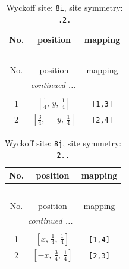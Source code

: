 \documentclass[fleqn,8pt]{jsarticle}
\begin{document}
\renewcommand{\arraystretch}{1.2}
\begin{longtable}{ccc}
\caption{Wyckoff site: {\tt 8i}, site symmetry: {\tt .2.}}
 \\
 \hline \hline
No. & position & mapping \\ \hline \endfirsthead

\multicolumn{2}{l}{\tablename\ \thetable{}} \\
 \hline \hline
No. & position & mapping \\ \hline \endhead

 \hline \hline
\multicolumn{2}{r}{\footnotesize\it continued ...} \\ \endfoot

 \hline \hline
\multicolumn{2}{r}{} \\ \endlastfoot

1 & $\left[ \frac{1}{4},\, y,\, \frac{1}{4} \right]$ & {\tt [1,3]} \\ \hline
2 & $\left[ \frac{3}{4},\, - y,\, \frac{1}{4} \right]$ & {\tt [2,4]} \\
\end{longtable}
\renewcommand{\arraystretch}{1.2}
\begin{longtable}{ccc}
\caption{Wyckoff site: {\tt 8j}, site symmetry: {\tt 2..}}
 \\
 \hline \hline
No. & position & mapping \\ \hline \endfirsthead

\multicolumn{2}{l}{\tablename\ \thetable{}} \\
 \hline \hline
No. & position & mapping \\ \hline \endhead

 \hline \hline
\multicolumn{2}{r}{\footnotesize\it continued ...} \\ \endfoot

 \hline \hline
\multicolumn{2}{r}{} \\ \endlastfoot

1 & $\left[ x,\, \frac{1}{4},\, \frac{1}{4} \right]$ & {\tt [1,4]} \\ \hline
2 & $\left[ - x,\, \frac{3}{4},\, \frac{1}{4} \right]$ & {\tt [2,3]} \\
\end{longtable}
\renewcommand{\arraystretch}{1.2}
\end{document}
